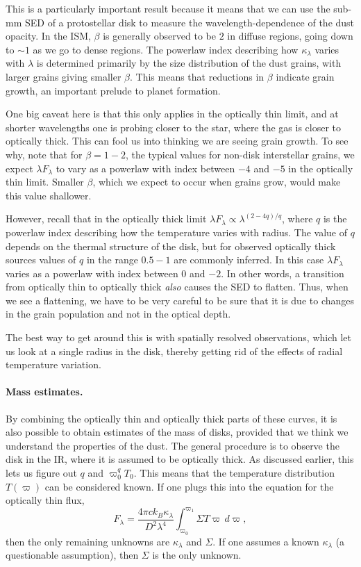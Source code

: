 This is a particularly important result because it means that we can use the sub-mm SED of a protostellar disk to measure the wavelength-dependence of the dust opacity. In the ISM, $\beta$ is generally observed to be $2$ in diffuse regions, going down to $\sim 1$ as we go to dense regions. The powerlaw index describing how $\kappa_{\lambda}$ varies with $\lambda$ is determined primarily by the size distribution of the dust grains, with larger grains giving smaller $\beta$. This means that reductions in $\beta$ indicate grain growth, an important prelude to planet formation.

One big caveat here is that this only applies in the optically thin limit, and at shorter wavelengths one is probing closer to the star, where the gas is closer to optically thick. This can fool us into thinking we are seeing grain growth. To see why, note that for $\beta=1-2$, the typical values for non-disk interstellar grains, we expect $\lambda F_{\lambda}$ to vary as a powerlaw with index between $-4$ and $-5$ in the optically thin limit. Smaller $\beta$, which we expect to occur when grains grow, would make this value shallower.

However, recall that in the optically thick limit $\lambda F_\lambda \propto \lambda^{(2-4q)/q}$, where $q$ is the powerlaw index describing how the temperature varies with radius. The value of $q$ depends on the thermal structure of the disk, but for observed optically thick sources values of $q$ in the range $0.5-1$ are commonly inferred. In this case $\lambda F_{\lambda}$ varies as a powerlaw with index between $0$ and $-2$. In other words, a transition from optically thin to optically thick {\it also} causes the SED to flatten. Thus, when we see a flattening, we have to be very careful to be sure that it is due to changes in the grain population and not in the optical depth.

The best way to get around this is with spatially resolved observations, which let us look at a single radius in the disk, thereby getting rid of the effects of radial temperature variation.

\paragraph{Mass estimates.}

By combining the optically thin and optically thick parts of these curves, it is also possible to obtain estimates of the mass of disks, provided that we think we understand the properties of the dust. The general procedure is to observe the disk in the IR, where it is assumed to be optically thick. As discussed earlier, this lets us figure out $q$ and $\varpi_0^q T_0$. This means that the temperature distribution $T(\varpi)$ can be considered known. If one plugs this into the equation for the optically thin flux,
\begin{equation}
F_{\lambda} = \frac{4\pi c k_B \kappa_{\lambda}}{D^2\lambda^4} \int_{\varpi_0}^{\varpi_1} \Sigma T \varpi \,d\varpi,
\end{equation}
then the only remaining unknowns are $\kappa_{\lambda}$ and $\Sigma$. If one assumes a known $\kappa_\lambda$ (a questionable assumption), then $\Sigma$ is the only unknown.

